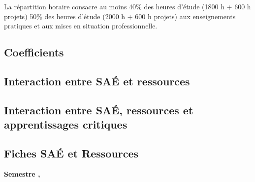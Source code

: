 \documentclass[10pt]{article}
\begin{document}
La répartition horaire consacre au moins 
40\% des heures d'étude (1800 h + 600 h projets)
50\% des heures d'étude (2000 h + 600 h projets)
aux enseignements pratiques et aux mises en situation professionnelle.

\newpage
\subsection{Coefficients}
\newpage
\subsection{Interaction entre SAÉ et ressources}
\newpage
\subsection{Interaction entre SAÉ, ressources et apprentissages critiques}

\newpage
\subsection{Fiches SAÉ et Ressources}

\textbf{Semestre , }\\
\par
\end{document}
